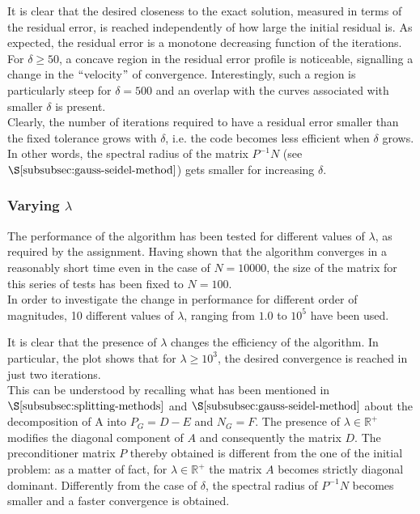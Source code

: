 \documentclass[11pt]{article}
\theoremstyle{theorem}
\theoremstyle{definition}
\begin{document}
It is clear that the desired closeness to the exact solution, measured in terms of the residual error, is reached independently of how large the initial residual is. As expected, the residual error is a monotone decreasing function of the iterations.\\
For $\delta\ge50$, a concave region in the residual error profile is noticeable, signalling a change in the $``$velocity$"$ of convergence. Interestingly, such a region is particularly steep for $\delta=500$ and an overlap with the curves associated with smaller $\delta$ is present.\\

Clearly, the number of iterations required to have a residual error smaller than the fixed tolerance grows with $\delta$, i.e. the code becomes less efficient when $\delta$ grows. In other words, the spectral radius of the matrix $P^{-1}N$ (see $\S\ref{subsubsec:gauss-seidel-method}$) gets smaller for increasing $\delta$.\\

\subsubsection{Varying $\lambda$}
The performance of the algorithm has been tested for different values of $\lambda$, as required by the assignment. Having shown that the algorithm converges in a reasonably short time even in the case of $N=10000$, the size of the matrix for this series of tests has been fixed to $N=100$.\\
In order to investigate the change in performance for different order of magnitudes, 10 different values of $\lambda$, ranging from $1.0$ to $10^5$ have been used.



It is clear that the presence of $\lambda$ changes the efficiency of the algorithm. In particular, the plot shows that for $\lambda\ge10^3$, the desired convergence is reached in just two iterations.\\
This can be understood by recalling what has been mentioned in $\S\ref{subsubsec:splitting-methods}$ and $\S\ref{subsubsec:gauss-seidel-method}$ about the decomposition of A into $P_G=D-E$ and $N_G=F$. The presence of $\lambda\in\mathbb{R}^{+}$ modifies the diagonal component of $A$ and consequently the matrix $D$. The preconditioner matrix $P$ thereby obtained is different from the one of the initial problem: as a matter of fact, for $\lambda\in\mathbb{R}^{+}$ the matrix $A$ becomes strictly diagonal dominant. Differently from the case of $\delta$, the spectral radius of $P^{-1}N$ becomes smaller and a faster convergence is obtained.\\
\end{document}
